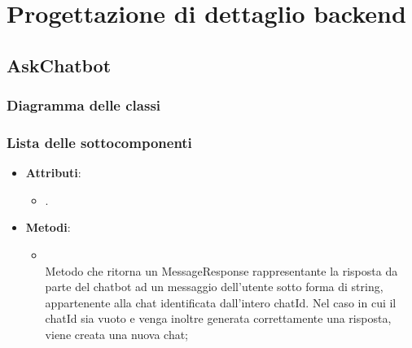 \documentclass[10pt, a4paper]{article}
\begin{document}
\newpage
   
\section{Progettazione di dettaglio backend}



\subsection{AskChatbot}
\subsubsection{Diagramma delle classi}
\subsubsection{Lista delle sottocomponenti}

\label{AskChatbotControllerDettaglio}
\begin{itemize}
    \item \textbf{Attributi}:
    \begin{itemize}
        \item {}.
    \end{itemize}
    \item \textbf{Metodi}:
    \begin{itemize}
        \item {}\\
        Metodo che ritorna un MessageResponse rappresentante la risposta da parte del chatbot ad un messaggio dell'utente sotto forma di string, appartenente alla chat identificata dall'intero chatId. Nel caso in cui il chatId sia vuoto e venga inoltre generata correttamente una risposta, viene creata una nuova chat;
        
    \end{itemize}
\end{itemize}
\end{document}
